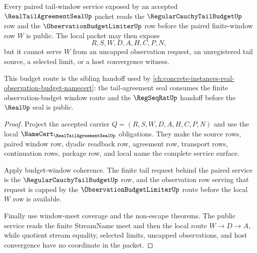 \begin{theorem}
\label{thm:real-tail-agreement-seal-budget-source-window-service}
Every paired tail-window service exposed by an accepted $\RealTailAgreementSealUp$ packet reads the $\RegularCauchyTailBudgetUp$ row and the $\ObservationBudgetLimiterUp$ row before the paired finite-window row $W$ is public. The local packet may then expose
$$
R,S,W,D,A,H,C,P,N,
$$
but it cannot serve $W$ from an uncapped observation request, an unregistered tail source, a selected limit, or a host convergence witness.

This budget route is the sibling handoff used by \autoref{ch:concrete-instances-real-observation-budget-namecert}: the tail-agreement seal consumes the finite observation-budget window route and the $\RegSeqRatUp$ handoff before the $\RealUp$ seal is public.
\end{theorem}
\begin{proof}
Project the accepted carrier $Q=(R,S,W,D,A,H,C,P,N)$ and use the local $\NameCert_{\RealTailAgreementSealUp}$ obligations. They make the source rows, paired window row, dyadic readback row, agreement row, transport rows, continuation rows, package row, and local name the complete service surface.

Apply budget-window coherence. The finite tail request behind the paired service is the $\RegularCauchyTailBudgetUp$ row, and the observation row serving that request is capped by the $\ObservationBudgetLimiterUp$ route before the local $W$ row is available.

Finally use window-meet coverage and the non-escape theorems. The public service reads the finite StreamName meet and then the local route $W \to D \to A$, while quotient stream equality, selected limits, uncapped observations, and host convergence have no coordinate in the packet.
\end{proof}

